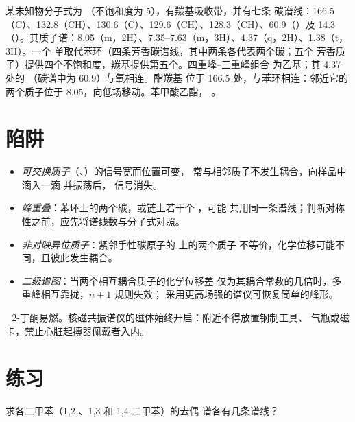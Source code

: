 \begin{example}[一种芳香酯，C$_9$H$_{10}$O$_2$]\label{ex:b2:structure-determination:ester}
某未知物分子式为 （不饱和度为 5），有羰基吸收带，并有七条
碳谱线：166.5（C）、132.8（CH）、130.6（C）、129.6（CH）、128.3（CH）、60.9（）及 14.3
（）。其质子谱：8.05（m，2H）、7.35--7.63（m，3H）、4.37（q，2H）、1.38（t，3H）。一个
单取代苯环（四条芳香碳谱线，其中两条各代表两个碳；五个
芳香质子）提供四个不饱和度，羰基提供第五个。四重峰–三重峰组合
为乙基；其 4.37 处的 （碳谱中为 60.9）与氧相连。酯羰基
位于 166.5 处，与苯环相连：邻近它的两个质子位于 8.05，向低场移动。苯甲酸乙酯，
。
\end{example}

\section{陷阱}

\begin{itemize}
  \item \emph{可交换质子}（、）的信号宽而位置可变，
        常与相邻质子不发生耦合，向样品中滴入一滴  并振荡后，
        信号消失。
  \item \emph{峰重叠}：苯环上的两个碳，或链上若干个 ，可能
        共用同一条谱线；判断对称性之前，应先将谱线数与分子式对照。
  \item \emph{非对映异位质子}：紧邻手性碳原子的  上的两个质子
        不等价，化学位移可能不同，且彼此发生耦合。
  \item \emph{二级谱图}：当两个相互耦合质子的化学位移差
        仅为其耦合常数的几倍时，多重峰相互靠拢，$n+1$ 规则失效；
        采用更高场强的谱仪可恢复简单的峰形。
\end{itemize}

\begin{safety}{\,\,}
2-丁酮易燃。核磁共振谱仪的磁体始终开启：附近不得放置钢制工具、
气瓶或磁卡，禁止心脏起搏器佩戴者入内。
\end{safety}

\section{练习}

\begin{exercise}[$\star$]\label{exo:b2:structure-determination:1}
求各二甲苯（1,2-、1,3-和
1,4-二甲苯）的去偶  谱各有几条谱线？
\end{exercise}

